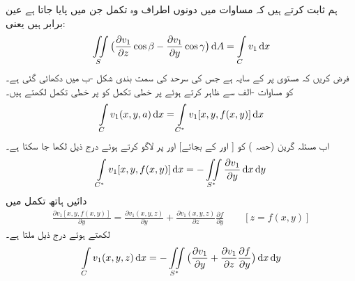 ہم ثابت کرتے ہیں کہ مساوات  میں دونوں اطراف وہ تکمل جن میں  پایا جاتا ہے عین برابر ہیں یعنی:
\begin{align}\label{مساوات_خطی_تکمل_سٹوکس_ٹ}
\iint\limits_S \big(\frac{\partial v_1}{\partial z}\cos \beta-\frac{\partial v_1}{\partial y}\cos \gamma\big)\dif A=\int\limits_C v_1\dif x
\end{align}
فرض کریں کہ  مستوی پر  کے   سایہ  ہے جس کی سرحد   کی سمت بندی  شکل -ب میں دکھائی گئی ہے۔ کو مساوات -الف سے ظاہر کرتے ہوئے  پر خطی تکمل کو  پر خطی تکمل لکھتے ہیں۔
\begin{align*}
\int\limits_C v_1(x,y,a)\dif x=\int\limits_{C^*}v_1[x,y,f(x,y)]\dif x
\end{align*}
اب مسئلہ گرین (حصہ ) کو [ اور  کے بجائے]  اور  پر لاگو کرتے ہوئے درج ذیل لکھا جا سکتا ہے۔
\begin{align*}
\int\limits_{C^*}v_1[x,y,f(x,y)]\dif x=-\iint\limits_{S^*}\frac{\partial v_1}{\partial y}\dif x\dif y
\end{align*}
دائیں ہاتھ تکمل میں
\begin{align*}
\frac{\partial v_1[x,y,f(x,y)]}{\partial y}=\frac{\partial v_1(x,y,z)}{\partial y}+\frac{\partial v_1(x,y,z)}{\partial z}\frac{\partial f}{\partial y}\quad\quad [z=f(x,y)]
\end{align*}
لکھتے ہوئے درج ذیل ملتا ہے۔
\begin{align}\label{مساوات_خطی_تکمل_سٹوکس_ث}
\int\limits_C v_1(x,y,z)\dif x=-\iint\limits_{S^*}\big(\frac{\partial v _1}{\partial y}+\frac{\partial v_1}{\partial z}\frac{\partial f}{\partial y}\big)\dif x\dif y
\end{align}


